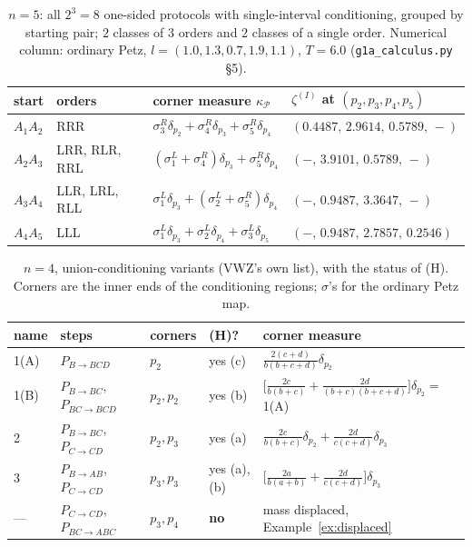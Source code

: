 \documentclass[11pt]{article}
\newcommand{\PP}{\mathcal P}
\theoremstyle{definition}\newtheorem{example}[theorem]{Example}
\begin{document}
\begin{table}[h]\centering\small
\caption{$n=5$: all $2^{3}=8$ one-sided protocols with single-interval conditioning, grouped by
starting pair; $2$ classes of $3$ orders and $2$ classes of a single order.  Numerical column: ordinary Petz,
$l=(1.0,1.3,0.7,1.9,1.1)$, $T=6.0$ (\texttt{g1a\_calculus.py} \S5).}
\label{tab:n5}
\begin{tabular}{@{}llll@{}}
\toprule
start & orders & corner measure $\kappa_\PP$ & $\zeta^{(I)}$ at $(p_2,p_3,p_4,p_5)$\\
\midrule
$A_1A_2$ & RRR &
 $\sigma^R_3\delta_{p_2}+\sigma^R_4\delta_{p_3}+\sigma^R_5\delta_{p_4}$ &
 $(0.4487,\,2.9614,\,0.5789,\,-)$\\
$A_2A_3$ & LRR, RLR, RRL &
 $(\sigma^L_1+\sigma^R_4)\delta_{p_3}+\sigma^R_5\delta_{p_4}$ &
 $(-,\,3.9101,\,0.5789,\,-)$\\
$A_3A_4$ & LLR, LRL, RLL &
 $\sigma^L_1\delta_{p_3}+(\sigma^L_2+\sigma^R_5)\delta_{p_4}$ &
 $(-,\,0.9487,\,3.3647,\,-)$\\
$A_4A_5$ & LLL &
 $\sigma^L_1\delta_{p_3}+\sigma^L_2\delta_{p_4}+\sigma^L_3\delta_{p_5}$ &
 $(-,\,0.9487,\,2.7857,\,0.2546)$\\
\bottomrule
\end{tabular}
\end{table}

\begin{table}[h]\centering\small
\caption{$n=4$, union-conditioning variants (VWZ's own list), with the status of (H).  Corners
are the inner ends of the conditioning regions; $\sigma$'s for the ordinary Petz map.}
\label{tab:n4union}
\begin{tabular}{@{}lllll@{}}
\toprule
name & steps & corners & (H)? & corner measure\\
\midrule
1(A) & $P_{B\to BCD}$ & $p_2$ & yes (c) &
 $\frac{2(c+d)}{b(b+c+d)}\delta_{p_2}$\\
1(B) & $P_{B\to BC}$, $P_{BC\to BCD}$ & $p_2,p_2$ & yes (b) &
 $\bigl[\frac{2c}{b(b+c)}+\frac{2d}{(b+c)(b+c+d)}\bigr]\delta_{p_2}=$ 1(A)\\
2 & $P_{B\to BC}$, $P_{C\to CD}$ & $p_2,p_3$ & yes (a) &
 $\frac{2c}{b(b+c)}\delta_{p_2}+\frac{2d}{c(c+d)}\delta_{p_3}$\\
3 & $P_{B\to AB}$, $P_{C\to CD}$ & $p_3,p_3$ & yes (a),(b) &
 $\bigl[\frac{2a}{b(a+b)}+\frac{2d}{c(c+d)}\bigr]\delta_{p_3}$\\
--- & $P_{C\to CD}$, $P_{BC\to ABC}$ & $p_3,p_4$ & \textbf{no} &
 mass displaced, Example~\ref{ex:displaced}\\
\bottomrule
\end{tabular}
\end{table}
\end{document}
